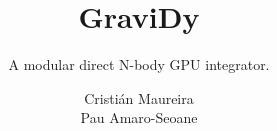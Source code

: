 \documentclass{beamer}
\author[C. Maureira \& P. Amaro-Seoane]
       {\large Cristián Maureira\\
       \large Pau Amaro-Seoane}%
\title[GraviDy]
      {\huge GraviDy}
\subtitle{\Large A modular direct N-body GPU integrator.}
\institute[AEI]
          {Albert Einstein Institute}
\begin{document}


\begin{frame}[t,plain]
    \titlepage
\end{frame}





%
%

\begin{frame}[t,plain]
\titlepage
\end{frame}

\begin{frame}[fragile]
\scriptsize

\end{frame}
\end{document}

